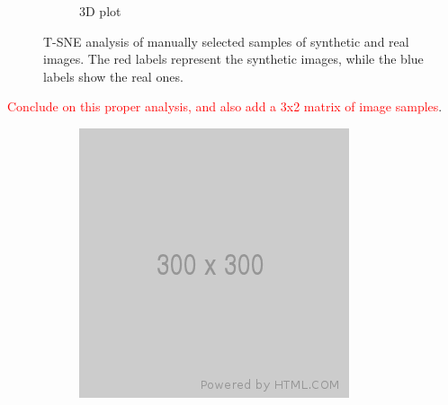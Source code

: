 \begin{figure}[h!]
\begin{subfigure}[h]{0.49\textwidth}
		\caption{3D plot}
	\end{subfigure}
	\caption[T-SNE analysis of hand-picked samples.]{T-SNE analysis of
	manually selected samples of synthetic and real images. The red labels
	represent the synthetic images, while the blue labels show the real ones.}
	\label{fig:tsne-manual}
\end{figure}

\textcolor{red}{Conclude on this proper analysis, and also add a 3x2 matrix
of image samples}.

\newpage

\begin{figure}[h!]
	\centering
	\begin{subfigure}{0.35\textwidth}
		\includegraphics[width=\textwidth]{figure/300x300.png}
	\end{subfigure}
	\begin{subfigure}{0.35\textwidth}

\end{subfigure}
\end{figure}
